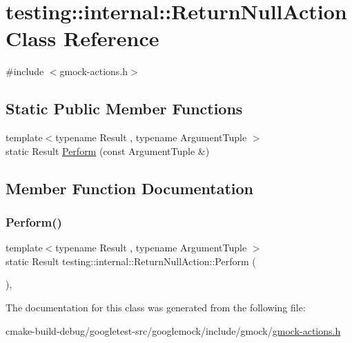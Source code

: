 \hypertarget{classtesting_1_1internal_1_1ReturnNullAction}{}\section{testing\+::internal\+::Return\+Null\+Action Class Reference}
\label{classtesting_1_1internal_1_1ReturnNullAction}


{\ttfamily \#include $<$gmock-\/actions.\+h$>$}

\subsection*{Static Public Member Functions}
\begin{DoxyCompactItemize}
\item 
{\footnotesize template$<$typename Result , typename Argument\+Tuple $>$ }\\static Result \mbox{\hyperlink{classtesting_1_1internal_1_1ReturnNullAction_a6ce1fba236686df93070320b399e4f32}{Perform}} (const Argument\+Tuple \&)
\end{DoxyCompactItemize}


\subsection{Member Function Documentation}
\mbox{\label{classtesting_1_1internal_1_1ReturnNullAction_a6ce1fba236686df93070320b399e4f32}} 
\subsubsection{\texorpdfstring{Perform()}{Perform()}}
{\footnotesize\ttfamily template$<$typename Result , typename Argument\+Tuple $>$ \\
static Result testing\+::internal\+::\+Return\+Null\+Action\+::\+Perform (\begin{DoxyParamCaption}\item[{const Argument\+Tuple \&}]{ }\end{DoxyParamCaption})\hspace{0.3cm}{\ttfamily [inline]}, {\ttfamily [static]}}



The documentation for this class was generated from the following file\+:\begin{DoxyCompactItemize}
\item 
cmake-\/build-\/debug/googletest-\/src/googlemock/include/gmock/\mbox{\hyperlink{gmock-actions_8h}{gmock-\/actions.\+h}}\end{DoxyCompactItemize}
